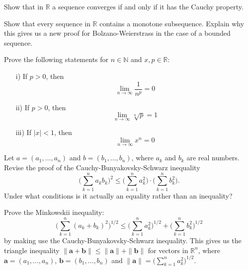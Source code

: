 \documentclass[11pt]{article}%
\begin{document}
\begin{Exercise}[title=**$\dagger$]
	Show that in $\mathbb{R}$ a sequence converges if and only if it has the Cauchy property.
\end{Exercise}

\begin{Exercise}[title=**]
	Show that every sequence in $\mathbb R$ contains a monotone subsequence. Explain why this gives us a new proof for Bolzano-Weierstrass in the case of a bounded sequence.
\end{Exercise}

\begin{Exercise}[title=**]
	Prove the following statements for $n\in \mathbb{N}$ and $x,p\in\mathbb{R}$:
	\begin{enumerate}[label={\alph*)}]
		\item[i)]{If $p>0$, then $$\lim\limits_{n\to\infty}\frac{1}{n^p}=0$$}
		\item[ii)]{If $p>0$, then $$\lim\limits_{n\to\infty}\sqrt[n]{p}=1$$}
		\item[iii)]{If $|x|<1$, then $$\lim\limits_{n\to\infty}x^n=0$$}
	\end{enumerate}
\end{Exercise}

\begin{Exercise}[title=**]
	Let $a=(a_1,\ldots, a_n)$ and $b=(b_1,\ldots, b_n)$, where $a_k$ and $b_k$ are real numbers. Revise the proof of the Cauchy-Bunyakovsky-Schwarz inequality 
	$$
	\Big(\sum_{k=1}^{n}a_kb_k\Big)^2\leq \Big(\sum_{k=1}^{n}a_k^2\Big)\cdot\Big(\sum_{k=1}^{n}b_k^2\Big).
	$$
	Under what conditions is it actually an equality rather than an inequality?
	\bigskip
\end{Exercise}

\begin{Exercise}[title=**]	
	Prove the Minkowskii inequality: $$\Big(\sum_{k=1}^{n}(a_k+b_k)^2\Big)^{1/2}\leq\Big(\sum_{k=1}^{n}a_k^2\Big)^{1/2}+\Big(\sum_{k=1}^{n}b_k^2\Big)^{1/2}
	$$ 
	by making use the Cauchy-Bunyakovsky-Schwarz inequality. This gives us the triangle inequality $\|\mathbf a+\mathbf b\|\leq\|\mathbf a\|+\|\mathbf b\|$ for vectors in $\mathbb R^n$, where $\mathbf a=(a_1,\ldots,a_n)$, $\mathbf b=(b_1,\ldots,b_n)$ and $\|\mathbf a\|=\Big(\sum_{k=1}^{n}a_k^2\Big)^{1/2}$.
	\bigskip
\end{Exercise}
\end{document}
